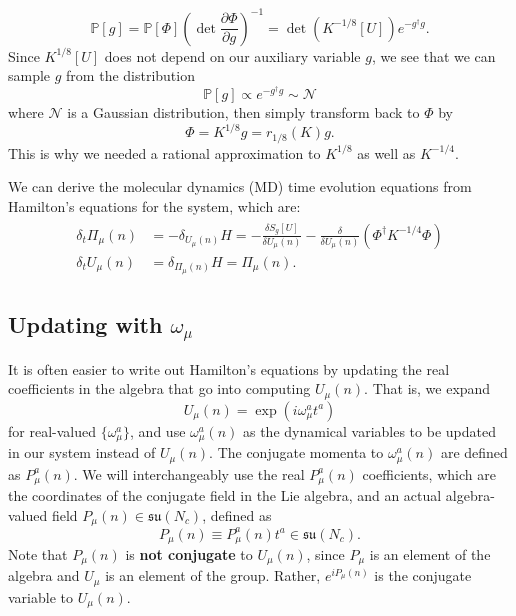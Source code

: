 \begin{itemize}
\begin{equation}
		\mathbb P[g] = \mathbb P[\Phi] \left( \det \frac{\partial \Phi}{\partial g} \right)^{-1} = \det\left( K^{-1/8}[U] \right) e^{-g^\dagger g}.
	\end{equation}
	Since $K^{1/8}[U]$ does not depend on our auxiliary variable $g$, we see that we can sample $g$ from the distribution
	\begin{equation}
		\mathbb P[g]\propto e^{-g^\dagger g} \sim \mathcal N
	\end{equation}
	where $\mathcal N$ is a Gaussian distribution, then simply transform back to $\Phi$ by
	\begin{equation}
		\Phi = K^{1/8} g = r_{1/8}(K) g.
	\end{equation}
	This is why we needed a rational approximation to $K^{1/8}$ as well as $K^{-1/4}$. 
\end{itemize}

We can derive the molecular dynamics (MD) time evolution equations from Hamilton's equations for the system, which are:
\begin{align}
\begin{split}
	\delta_t \Pi_\mu(n) &= -\delta_{U_\mu(n)} H = - \frac{\delta S_g[U]}{\delta U_\mu(n)} - \frac{\delta}{\delta U_\mu(n)} \left( \Phi^\dagger K^{-1/4} \Phi \right) \\
	\delta_t U_\mu(n) &= \delta_{\Pi_\mu(n)} H = \Pi_\mu(n). 
\end{split}
\end{align}

\subsection{Updating with $\omega_\mu$}

It is often easier to write out Hamilton's equations by updating the real coefficients in the algebra that go into computing $U_\mu(n)$. That is, we expand
\begin{equation}
	U_\mu(n) = \exp \left( i \omega_\mu^a t^a \right)
\end{equation}
for real-valued $\{\omega_\mu^a\}$, and use $\omega_\mu^a(n)$ as the dynamical variables to be updated in our system instead of $U_\mu(n)$. The conjugate momenta to $\omega_\mu^a(n)$ are defined as $P_\mu^a(n)$. We will interchangeably use the real $P_\mu^a(n)$ coefficients, which are the coordinates of the conjugate field in the Lie algebra, and an actual algebra-valued field $P_\mu(n)\in\mathfrak{su}(N_c)$, defined as
\begin{equation}
	P_\mu(n)\equiv P_\mu^a(n) t^a\in\mathfrak{su}(N_c).
\end{equation}
Note that $P_\mu(n)$ is \textbf{not conjugate} to $U_\mu(n)$, since $P_\mu$ is an element of the algebra and $U_\mu$ is an element of the group. Rather, $e^{iP_\mu(n)}$ is the conjugate variable to $U_\mu(n)$. 

